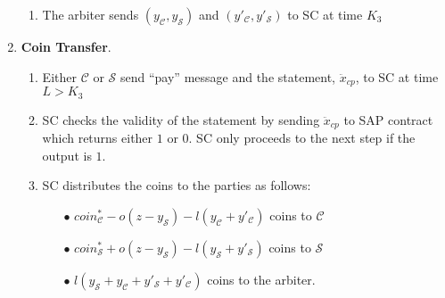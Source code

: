 \begin{enumerate}
\begin{enumerate}
\item The arbiter sends $(y_{\scriptscriptstyle\mathcal C},y_{\scriptscriptstyle\mathcal S})$ and $(y'_{\scriptscriptstyle\mathcal C},y'_{\scriptscriptstyle\mathcal S})$ to SC at time $K_{\scriptscriptstyle 3}$
\end{enumerate}
\item \textbf{Coin Transfer}\label{RCSP::CoinTransfer}.
\begin{enumerate}
\item Either $\mathcal C$ or $\mathcal S$ send ``pay'' message and the statement, $\ddot{x}_{\scriptscriptstyle cp}$,  to SC at time $L>K_{\scriptscriptstyle 3}$
\item SC checks the validity of the statement by sending $\ddot{x}_{\scriptscriptstyle cp}$ to SAP contract which  returns  either $1$ or $0$. SC only proceeds to the next step if the output is $1$. 
\item SC distributes the coins to the parties as follows:

\begin{itemize}
\item[$\bullet$]   $coin^{\scriptscriptstyle *}_{\scriptscriptstyle\mathcal C}-o(z-y_{\scriptscriptstyle\mathcal S})-l(y_{\scriptscriptstyle\mathcal C}+y'_{\scriptscriptstyle\mathcal C})$ coins  to $\mathcal C$
\item[$\bullet$] $coin^{\scriptscriptstyle *}_{\scriptscriptstyle\mathcal S}+o(z-y_{\scriptscriptstyle\mathcal S})-l(y_{\scriptscriptstyle\mathcal S}+y'_{\scriptscriptstyle\mathcal S})$ coins to $\mathcal S$
\item[$\bullet$] $l(y_{\scriptscriptstyle\mathcal S}+y_{\scriptscriptstyle\mathcal C}+y'_{\scriptscriptstyle\mathcal S}+y'_{\scriptscriptstyle\mathcal C})$ coins to the arbiter.  
\end{itemize}

\end{enumerate}
\end{enumerate}



